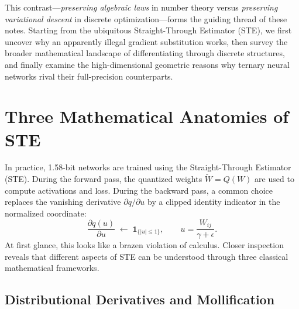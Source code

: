 This contrast—\emph{preserving algebraic laws} in number theory versus \emph{preserving variational descent} in discrete optimization—forms the guiding thread of these notes. Starting from the ubiquitous Straight-Through Estimator (STE), we first uncover why an apparently illegal gradient substitution works, then survey the broader mathematical landscape of differentiating through discrete structures, and finally examine the high-dimensional geometric reasons why ternary neural networks rival their full-precision counterparts.

\section{Three Mathematical Anatomies of STE}

In practice, 1.58-bit networks are trained using the Straight-Through Estimator (STE). During the forward pass, the quantized weights $\widetilde{W} = Q(W)$ are used to compute activations and loss. During the backward pass, a common choice replaces the vanishing derivative $\partial q/\partial u$ by a clipped identity indicator in the normalized coordinate:
\begin{equation}
    \frac{\partial q(u)}{\partial u} \;\longleftarrow\; \mathbf{1}_{\{|u|\leq 1\}},\qquad u=\frac{W_{ij}}{\gamma+\epsilon}.
\end{equation}
At first glance, this looks like a brazen violation of calculus. Closer inspection reveals that different aspects of STE can be understood through three classical mathematical frameworks.

\subsection{Distributional Derivatives and Mollification}

